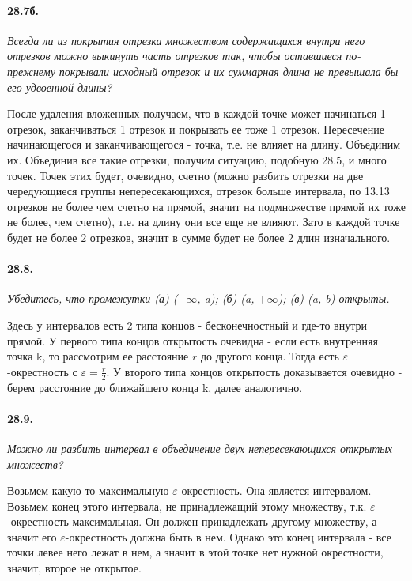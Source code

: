 \documentclass{book}
\begin{document}
\paragraph{28.7б.}
\textit{Всегда ли из покрытия отрезка множеством содержащихся внутри него отрезков можно выкинуть часть отрезков так, чтобы оставшиеся по-прежнему покрывали исходный отрезок и их суммарная длина не превышала бы его удвоенной длины?}

После удаления вложенных получаем, что в каждой точке может начинаться 1 отрезок, заканчиваться 1 отрезок и покрывать ее тоже 1 отрезок. Пересечение начинающегося и заканчивающегося - точка, т.е. не влияет на длину. Объединим их. Объединив все такие отрезки, получим ситуацию, подобную 28.5, и много точек. Точек этих будет, очевидно, счетно (можно разбить отрезки на две чередующиеся группы непересекающихся, отрезок больше интервала, по 13.13 отрезков не более чем счетно на прямой, значит на подмножестве прямой их тоже не более, чем счетно), т.е. на длину они все еще не влияют. Зато в каждой точке будет не более 2 отрезков, значит в сумме будет не более 2 длин изначального.

\paragraph{28.8.}
\textit{Убедитесь, что промежутки (а) ($-\infty$, a); (б) (a, $+\infty$); (в) (a, b) открыты.}

Здесь у интервалов есть 2 типа концов - бесконечностный и где-то внутри прямой. У первого типа концов открытость очевидна - если есть внутренняя точка k, то рассмотрим ее расстояние $r$ до другого конца. Тогда есть $\varepsilon$-окрестность с $\varepsilon = \frac{r}{2}$.
У второго типа концов открытость доказывается очевидно - берем расстояние до ближайшего конца k, далее аналогично.

\paragraph{28.9.}
\textit{Можно ли разбить интервал в объединение двух непересекающихся открытых множеств?}

Возьмем какую-то максимальную $\varepsilon$-окрестность. Она является интервалом. Возьмем конец этого интервала, не принадлежащий этому множеству, т.к. $\varepsilon$-окрестность максимальная. Он должен принадлежать другому множеству, а значит его $\varepsilon$-окрестность должна быть в нем. Однако это конец интервала - все точки левее него лежат в нем, а значит в этой точке нет нужной окрестности, значит, второе не открытое. 
\end{document}

